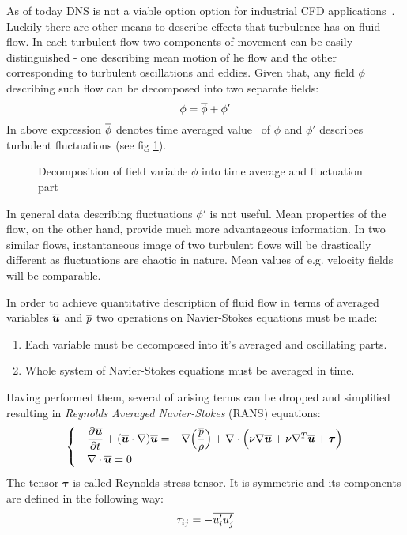         As of today DNS is not a viable option option for industrial CFD applications~\cite{Spalart}. Luckily there are other means to describe effects that turbulence has on fluid flow.
        In each turbulent flow two components of movement can be easily distinguished - one describing mean motion of he flow and the other corresponding to turbulent oscillations and eddies. 
        Given that, any field $\phi$ describing such flow can be decomposed into two separate fields:
        \begin{equation}
        \phi = \overline{{\phi}} + \phi'
        \end{equation}
        In above expression $\overline{{\phi}}$ denotes time averaged value~\cite{Wilcox} of $\phi$ and $\phi'$ describes turbulent fluctuations (see fig \ref{fig:RANSdecom}).

        \begin{figure}
            \centering
            
            \label{fig:RANSdecom}
            \caption{Decomposition of field variable $\phi$ into time average and fluctuation part}
        \end{figure}

        In general data describing fluctuations $\phi'$ is not useful. Mean properties of the flow, on the other hand, provide much more advantageous information.
        In two similar flows, instantaneous image of two turbulent flows will be drastically different as fluctuations are chaotic in nature.
        Mean values of e.g. velocity fields will be comparable.

        In order to achieve quantitative description of fluid flow in terms of averaged variables $\overline{{\bm{{u}}}}$ and $\overline{{p}}$ two operations on Navier-Stokes equations must be made:
        \begin{enumerate}
        \item Each variable must be decomposed into it's averaged and oscillating parts.
        \item Whole system of Navier-Stokes equations must be averaged in time.
        \end{enumerate}
        Having performed them, several of arising terms can be dropped and simplified resulting in \emph{Reynolds Averaged Navier-Stokes} (RANS) equations:
        \begin{equation}
        \begin{cases}
            &\pderiv{\rans{\bVec{u}}}{t} + (\rans{\bVec{u}} \cdot \nabla)\rans{\bVec{u}} = -\nabla \Big(\dfrac{\rans{p}}{\rho} \Big) %
            + \nabla\cdot \Big(\nu\nabla\rans{\bVec{u}} + \nu\nabla^T \rans{\bVec{u}} + \bm{\tau} \Big)\\
            &\nabla \cdot \rans{\bVec{u}} = 0
        \end{cases}
        \end{equation}
        The tensor $\bm{\tau}$ is called Reynolds stress tensor. It is symmetric and its components are defined in the following way:
        \begin{equation}
        \tau_{ij} = -\overline{{u_i' u_j'}}
        \end{equation}

